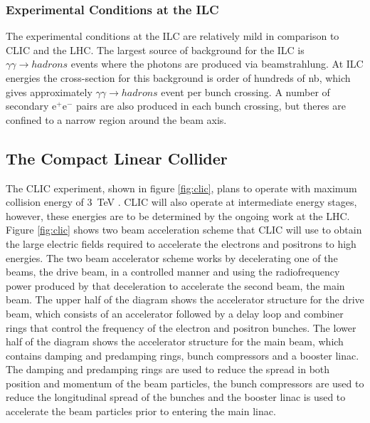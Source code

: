 \subsubsection{Experimental Conditions at the ILC}
{The experimental conditions at the ILC are relatively mild in comparison to CLIC and the LHC.  The largest source of background for the ILC is $\gamma\gamma \rightarrow hadrons$ events where the photons are produced via beamstrahlung.  At ILC energies the cross-section for this background is order of hundreds of nb, which gives approximately $\gamma\gamma \rightarrow hadrons$ event per bunch crossing.  A number of secondary $\text{e}^{+}\text{e}^{-}$ pairs are also produced in each bunch crossing, but theres are confined to a narrow region around the beam axis.}


\subsection{The Compact Linear Collider}
The CLIC experiment, shown in figure \ref{fig:clic}, plans to operate with maximum collision energy of 3~TeV \cite{Linssen:2012hp, CLIC:2016zwp}.  CLIC will also operate at intermediate energy stages, however, these energies are to be determined by the ongoing work at the LHC.  {Figure \ref{fig:clic} shows two beam acceleration scheme \cite{Aicheler:2012bya} that CLIC will use to obtain the large electric fields required to accelerate the electrons and positrons to high energies.  The two beam accelerator scheme works by decelerating one of the beams, the drive beam, in a controlled manner and using the radiofrequency power produced by that deceleration to accelerate the second beam, the main beam.  The upper half of the diagram shows the accelerator structure for the drive beam, which consists of an accelerator followed by a delay loop and combiner rings that control the frequency of the electron and positron bunches.  The lower half of the diagram shows the accelerator structure for the main beam, which contains damping and predamping rings, bunch compressors and a booster linac.  The damping and predamping rings are used to reduce the spread in both position and momentum of the beam particles, the bunch compressors are used to reduce the longitudinal spread of the bunches and the booster linac is used to accelerate the beam particles prior to entering the main linac.}

